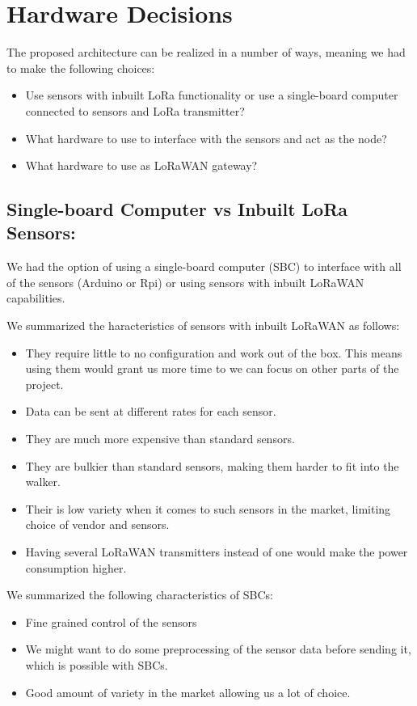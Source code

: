 \section{Hardware Decisions}

	The proposed architecture can be realized in a number of ways, meaning we had to make the following choices:
	\begin{itemize}
		\item Use sensors with inbuilt LoRa functionality or use a single-board computer connected to sensors and LoRa transmitter?
		\item What hardware to use to interface with the sensors and act as the node?
		\item What hardware to use as LoRaWAN gateway?
	\end{itemize}


	\subsection{Single-board Computer vs Inbuilt LoRa Sensors:}

		We had the option of using a single-board computer (SBC) to interface with all of the sensors (Arduino or Rpi) or using sensors with inbuilt LoRaWAN capabilities.

		We summarized the haracteristics of sensors with inbuilt LoRaWAN as follows:
		\begin{itemize}
			\item They require little to no configuration and work out of the box. This means using them would grant us more time to we can focus on other parts of the project.
			\item Data can be sent at different rates for each sensor.
			\item They are much more expensive than standard sensors.
			\item They are bulkier than standard sensors, making them harder to fit into the walker.
			\item Their is low variety when it comes to such sensors in the market, limiting choice of vendor and sensors.
			\item Having several LoRaWAN transmitters instead of one would make the power consumption higher.
		\end{itemize}


		We summarized the following characteristics of SBCs:
		\begin{itemize}
			\item Fine grained control of the sensors
			\item We might want to do some preprocessing of the sensor data before sending it, which is possible with SBCs.
			\item Good amount of variety in the market allowing us a lot of choice.
		\end{itemize}

